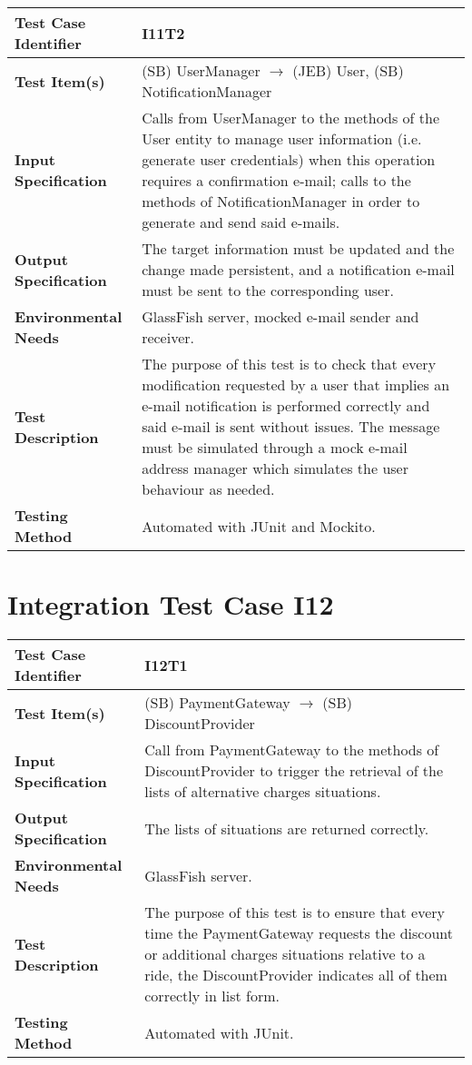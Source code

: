\begin{longtable}{p{} | p{}}
\hline
\textbf{Test Case Identifier} & I11T2\\
\hline
\textbf{Test Item(s)} & (SB) UserManager $\rightarrow$ (JEB) User, (SB) NotificationManager \\
\hline
\textbf{Input Specification} & Calls from UserManager to the methods of the User entity to manage user information (i.e. generate user credentials) when this operation requires a confirmation e-mail; calls to the methods of NotificationManager in order to generate and send said e-mails. \\
\hline
\textbf{Output Specification} & The target information must be updated and the change made persistent, and a notification e-mail must be sent to the corresponding user. \\
\hline
\textbf{Environmental Needs} & GlassFish server, mocked e-mail sender and receiver. \\
\hline
\textbf{Test Description} & The purpose of this test is to check that every modification requested by a user that implies an e-mail notification is performed correctly and said e-mail is sent without issues. The message must be simulated through a mock e-mail address manager which simulates the user behaviour as needed. \\
\hline
\textbf{Testing Method} & Automated with JUnit and Mockito. \\
\hline
\end{longtable}

\section{Integration Test Case I12}

\begin{longtable}{p{} | p{}}
\hline
\textbf{Test Case Identifier} & I12T1\\
\hline
\textbf{Test Item(s)} & (SB) PaymentGateway $\rightarrow$ (SB) DiscountProvider \\
\hline
\textbf{Input Specification} & Call from PaymentGateway to the methods of DiscountProvider to trigger the retrieval of the lists of alternative charges situations. \\
\hline
\textbf{Output Specification} & The lists of situations are returned correctly. \\
\hline
\textbf{Environmental Needs} & GlassFish server. \\
\hline
\textbf{Test Description} & The purpose of this test is to ensure that every time the PaymentGateway requests the discount or additional charges situations relative to a ride, the DiscountProvider indicates all of them correctly in list form. \\
\hline
\textbf{Testing Method} & Automated with JUnit. \\
\hline
\end{longtable}

